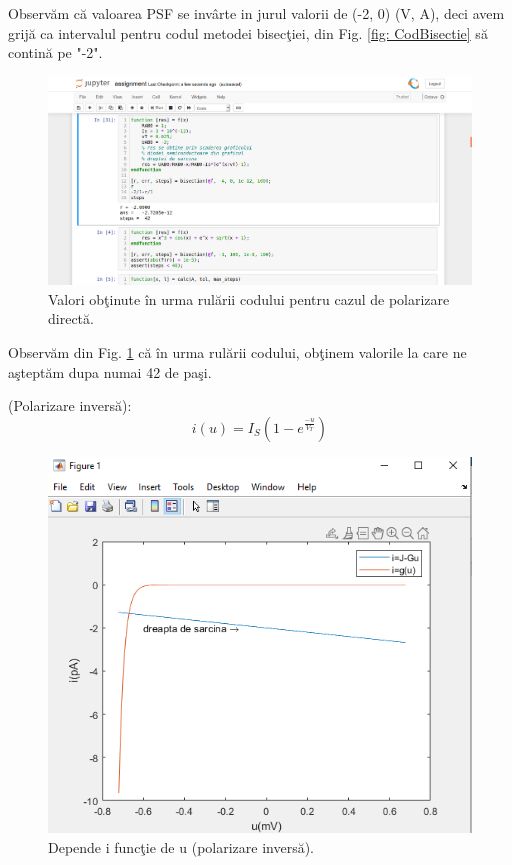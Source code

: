 \documentclass[multi=false, tikz, border=2mm]{article}
\begin{document}
	 Observ\u{a}m c\u{a} valoarea PSF se inv\^{a}rte in jurul valorii de (-2, 0) (V, A), deci avem grij\u{a} ca intervalul pentru codul metodei bisec\c{t}iei, din Fig. \ref{fig: CodBisectie} s\u{a} contin\u{a} pe "-2". 
	
	\begin{figure}[H]
		\hspace{.6cm}
		\includegraphics[trim = 200 180 610 110, clip, scale=0.6]{PozaValPolDirecta}
		\caption{Valori ob\c{t}inute \^{i}n urma rul\u{a}rii codului pentru cazul de polarizare direct\u{a}.}\label{fig:ValDirecta}
	\end{figure}
\vspace{-0.4cm}
Observ\u{a}m din Fig. \ref{fig:ValDirecta} c\u{a} \^{i}n urma rul\u{a}rii codului, ob\c{t}inem valorile la care ne a\c{s}tept\u{a}m dupa numai 42 de pa\c{s}i.
\pagebreak

	{\color{orange}{\bf Cazul 2}} (Polarizare invers\u{a}):
	\begin{equation} \label{eq:ecPolInv}
	i(u) = I_{S}(1-e^{\frac{-u}{V_{T}}})
	\end{equation}
	\vspace{-0.6cm}
	\begin{figure}[H]
		\hspace{1.7cm}
		\includegraphics[trim = 20 0 23 70, clip, scale=0.6]{PolarizareInversa}
		\caption{Depende i func\c{t}ie de u (polarizare invers\u{a}).}\label{fig:Depiu2}
	\end{figure}
\end{document}
